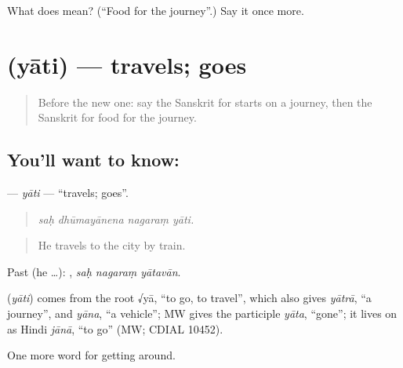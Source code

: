 \begin{tcolorbox}[breakable,colback=teal!4,colframe=teal!35!black,title={Before you move on}]
What does  mean? (\textquotedblleft{}Food for the journey\textquotedblright{}.) Say it once more.
\end{tcolorbox}
\section[\texorpdfstring{\sk{याति} (yāti)}{याति (yāti)}]{ (yāti) — travels; goes}

\label{lesson:SA-C394-yati}



\begin{quote}
Before the new one: say the Sanskrit for starts on a journey, then the Sanskrit for food for the journey.
\end{quote}

\subsection*{You'll want to know: }
\textbf{} — \emph{yāti} — \textquotedblleft{}travels; goes\textquotedblright{}.

\begin{quote}
   
\end{quote}

\begin{quote}
\emph{saḥ dhūmayānena nagaraṃ yāti.}
\end{quote}

\begin{quote}
He travels to the city by train.
\end{quote}

Past (he …):   , \emph{saḥ nagaraṃ yātavān}.

\begin{cousinweb}
\textbf{} (\emph{yāti}) comes from the root √yā, \textquotedblleft{}to go, to travel\textquotedblright{}, which also gives \emph{yātrā}, \textquotedblleft{}a journey\textquotedblright{}, and \emph{yāna}, \textquotedblleft{}a vehicle\textquotedblright{}; MW gives the participle \emph{yāta}, \textquotedblleft{}gone\textquotedblright{}; it lives on as Hindi \emph{jānā}, \textquotedblleft{}to go\textquotedblright{} (MW; CDIAL 10452).
\end{cousinweb}

\begin{grammarlens}[title={What you've built}]
One more word for getting around.
\end{grammarlens}

